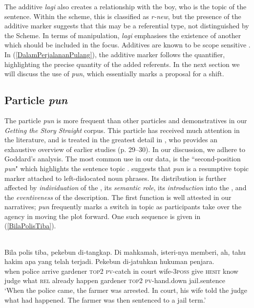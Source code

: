 \documentclass[output=paper
,modfonts
,nonflat]{langsci/langscibook}
\begin{document}
\noindent
The additive \emph{lagi} also creates a relationship with the boy, who is the topic of the sentence. Within the  scheme, this  is classified as \emph{r-new}, but the presence of the additive marker suggests that this may be a referential type, not distinguished by the  Scheme. In terms of  manipulation, \emph{lagi} emphasises the existence of another  which should be included in the focus. Additives are known to be scope sensitive \citep[72]{Forker2016}. In (\ref{DalamPerjalananPulang}), the additive marker follows the quantifier, highlighting the precise quantity of the added referents. In the next section we will discuss the use of \emph{pun}, which essentially marks a proposal for a  shift.

\subsection{Particle \emph{pun}}\label{GivenPun}
The particle \emph{pun} is more frequent than other particles and demonstratives in our \emph{Getting the Story Straight} corpus. This particle has received much attention in the literature, and is treated in the greatest detail in \cite{Goddard2001}, who provides an exhaustive overview of earlier studies (p. 29--30). In our discussion, we adhere to Goddard's analysis. The most common use in our data, is the ``second-position \emph{pun}" which highlights the sentence topic \citep[31]{Goddard2001}. \cite[107]{Cumming1991} suggests that \emph{pun} is a resumptive topic marker attached to left-dislocated noun phrases. Its distribution is further affected by \emph{individuation} of the , its \emph{semantic role}, its \emph{introduction} into the , and the \emph{eventiveness} of the description. The first function is well attested in our narratives; \emph{pun} frequently marks a switch in topic as participants take over the agency in moving the plot forward. One such sequence is given in (\ref{BilaPolisTiba}).

\ea\label{BilaPolisTiba} 
\\
\gll Bila polis  tiba,   {\ob}pekebun    di-tangkap. Di mahkamah, isteri-nya     memberi, ah,   tahu hakim apa  yang telah   terjadi.  {\ob}Pekebun    di-jatuhkan      {hukuman penjara}.\\
when police arrive gardener \textsc{top2} \textsc{pv-}catch in court     wife-\textsc{3poss} give     \textsc{hesit} know judge what \textsc{rel}  already happen gardener \textsc{top2} \textsc{pv-}hand.down     jail.sentence\\
\glt `When the police came, the farmer was arrested. In court, his wife told the judge what had happened. The farmer was then sentenced to a jail term.'
\z
\end{document}
